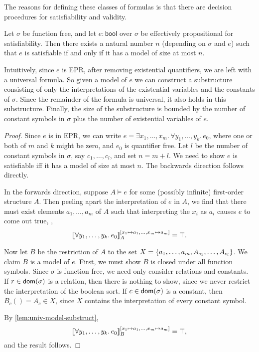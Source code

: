 The reasons for defining these classes of formulas is that there are
  decision procedures for satisfiability and validity.

\begin{lemma}\label{lem:epr-small-model-property}
  Let $\sigma$ be function free,
  and let $e : \mathsf{bool}$ over $\sigma$ be effectively propositional for satisfiability.
  Then there exists a natural number $n$ (depending on $\sigma$ and $e$) such that
  $e$ is satisfiable if and only if it has a model of size at most $n$.

  Intuitively, since $e$ is EPR, after removing existential quantifiers, we are left with a universal formula.
  So given a model of $e$ we can construct a substructure consisting of only the interpretations
  of the existential variables and the constants of $\sigma$. Since the remainder of the formula is universal,
  it also holds in this substructure.
  Finally, the size of the substructure is bounded
  by the number of constant symbols in $\sigma$ plus the number of existential variables of $e$.
\end{lemma}
\begin{proof}
  Since $e$ is in EPR, we can write $e = \exists x_1, \dots, x_m.\, \forall y_1, \dots, y_k.\, e_0$,
  where one or both of $m$ and $k$ might be zero, and $e_0$ is quantifier free.
  Let $l$ be the number of constant symbols in $\sigma$, say $c_1, \dots, c_l$,
  and set $n = m + l$. We need to show $e$ is satisfiable iff it has a model of size at most $n$.
  The backwards direction follows directly.

  In the forwards direction, suppose $A \models e$ for some (possibly infinite) first-order structure $A$.
  Then peeling apart the interpretation of $e$ in $A$, we find that there must exist elements $a_1, \dots, a_m$
  of $A$ such that interpreting the $x_i$ as $a_i$ causes $e$ to come out true, \ie,
  \[
    \llbracket{\forall y_1, \dots, y_k.\, e_0}\rrbracket_A^{[x_1\mapsto a_1, \dots, x_m \mapsto a_m]} = \top.
  \]

  Now let $B$ be the restriction of $A$ to the set $X = \left\{{a_1, \dots, a_m, A_{c_1}, \dots, A_{c_l}}\right\}$.
  We claim $B$ is a model of $e$.
  First, we must show $B$ is closed under all function symbols.
  Since $\sigma$ is function free, we need only consider relations and constants.
  If $r\in\mathsf{dom}(\sigma)$ is a relation, then there is nothing to show,
  since we never restrict the interpretation of the boolean sort.
  If $c\in\mathsf{dom}(\sigma)$ is a constant, then $B_c() = A_c \in X$,
  since $X$ contains the interpretation of every constant symbol.

  By \cref{lem:univ-model-substruct},
  \[
    \llbracket{\forall y_1, \dots, y_k.\, e_0}\rrbracket_B^{[x_1\mapsto a_1, \dots, x_m \mapsto a_m]} = \top,
  \]
  and the result follows.
\end{proof}

